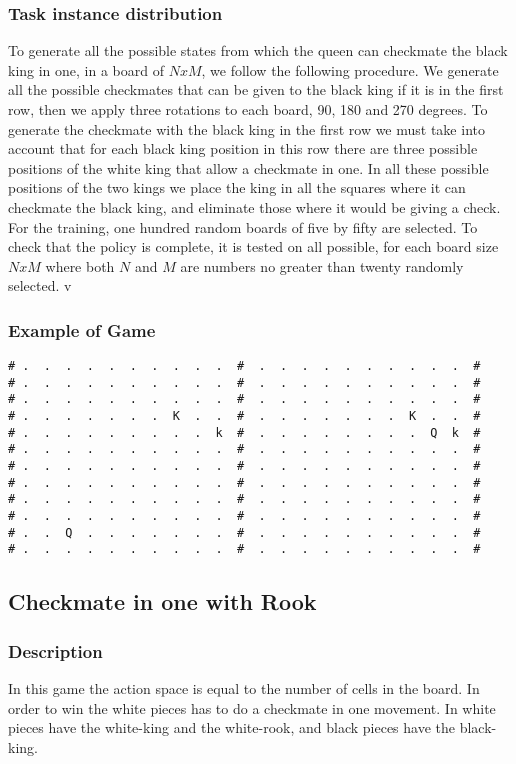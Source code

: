 \documentclass[a4paper]{article}
\begin{document}
\subsubsection{Task instance distribution}
To generate all the possible states from which the queen can checkmate the black king in one, in a board of $NxM$, we follow the following procedure. We generate all the possible checkmates that can be given to the black king if it is in the first row, then we apply three rotations to each board, 90, 180 and 270 degrees. To generate the checkmate with the black king in the first row we must take into account that for each black king position in this row there are three possible positions of the white king that allow a checkmate in one. In all these possible positions of the two kings we place the king in all the squares where it can checkmate the black king, and eliminate those where it would be giving a check. For the training, one hundred random boards of five by fifty are selected. To check that the policy is complete, it is tested on all possible, for each board size $NxM$ where both $N$ and $M$ are numbers no greater than twenty randomly selected.
v
\subsubsection{Example of Game}
\begin{Verbatim}[fontsize=\footnotesize]
# .  .  .  .  .  .  .  .  .  .  #  .  .  .  .  .  .  .  .  .  .  #
# .  .  .  .  .  .  .  .  .  .  #  .  .  .  .  .  .  .  .  .  .  #
# .  .  .  .  .  .  .  .  .  .  #  .  .  .  .  .  .  .  .  .  .  #
# .  .  .  .  .  .  .  K  .  .  #  .  .  .  .  .  .  .  K  .  .  #
# .  .  .  .  .  .  .  .  .  k  #  .  .  .  .  .  .  .  .  Q  k  #
# .  .  .  .  .  .  .  .  .  .  #  .  .  .  .  .  .  .  .  .  .  #
# .  .  .  .  .  .  .  .  .  .  #  .  .  .  .  .  .  .  .  .  .  #
# .  .  .  .  .  .  .  .  .  .  #  .  .  .  .  .  .  .  .  .  .  #
# .  .  .  .  .  .  .  .  .  .  #  .  .  .  .  .  .  .  .  .  .  #
# .  .  .  .  .  .  .  .  .  .  #  .  .  .  .  .  .  .  .  .  .  #
# .  .  Q  .  .  .  .  .  .  .  #  .  .  .  .  .  .  .  .  .  .  #
# .  .  .  .  .  .  .  .  .  .  #  .  .  .  .  .  .  .  .  .  .  #
\end{Verbatim}

\subsection{Checkmate in one with Rook}
\subsubsection{Description}
In this game the action space is equal to the number of cells in the board. In order to win the white pieces has to do a checkmate in one movement. In white pieces have the white-king and the white-rook, and black pieces have the black-king.
\end{document}
